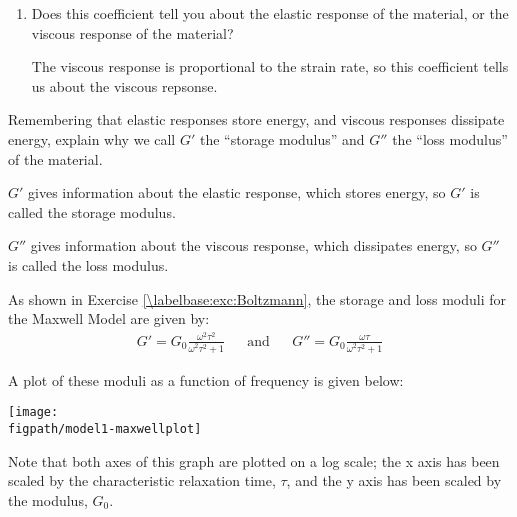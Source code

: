 \begin{activity}
\begin{ctqs}
\begin{enumerate}
				\item Does this coefficient tell you about the elastic response of the material, or the viscous response of the material?
	
					\begin{solution}[1in]
					
						The viscous response is proportional to the strain rate, so this coefficient tells us about the viscous repsonse.
					
					\end{solution}
					
			\end{enumerate}
		
		\question Remembering that elastic responses store energy, and viscous responses dissipate energy, explain why we call $G'$ the ``storage modulus'' and $G''$ the ``loss modulus'' of the material.
	
					\begin{solution}[2in]
					
						$G'$ gives information about the elastic response, which stores energy, so $G'$ is called the storage modulus.
						
						$G''$ gives information about the viscous response, which dissipates energy, so $G''$ is called the loss modulus.
					\end{solution}
			
\end{ctqs}

\clearpage
\begin{model}
	As shown in Exercise \ref{\labelbase:exc:Boltzmann}, the storage and loss moduli for the Maxwell Model are given by:
	\begin{align*}
		G' = G_0 \frac{\omega^2 \tau^2}{\omega^2 \tau^2 + 1} && \text{and} && G'' = G_0 \frac{\omega \tau}{\omega^2 \tau^2 + 1}
	\end{align*}
	
	A plot of these moduli as a function of frequency is given below:
			
		\vspace{0.1in}	
		\centerline{\texttt{[image: \\figpath/model1-maxwellplot]}}
	
	Note that both axes of this graph are plotted on a log scale; the x axis has been scaled by the characteristic relaxation time, $\tau$, and the y axis has been scaled by the modulus, $G_0$.
	
\end{model}


\end{activity}
